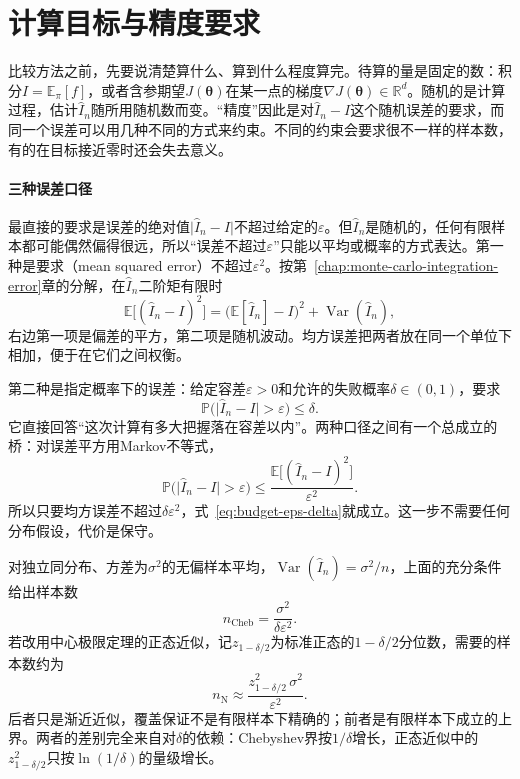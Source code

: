 \section{计算目标与精度要求}
\label{sec:budget-targets}

比较方法之前，先要说清楚算什么、算到什么程度算完。待算的量是固定的数：积分$I=\mathbb{E}_{\pi}[f]$，或者含参期望$J(\bm{\theta})$在某一点的梯度$\nabla J(\bm{\theta})\in\mathbb{R}^{d}$。随机的是计算过程，估计$\hat{I}_n$随所用随机数而变。“精度”因此是对$\hat{I}_n-I$这个随机误差的要求，而同一个误差可以用几种不同的方式来约束。不同的约束会要求很不一样的样本数，有的在目标接近零时还会失去意义。

\paragraph{三种误差口径}
最直接的要求是误差的绝对值$\lvert\hat{I}_n-I\rvert$不超过给定的$\varepsilon$。但$\hat{I}_n$是随机的，任何有限样本都可能偶然偏得很远，所以“误差不超过$\varepsilon$”只能以平均或概率的方式表达。第一种是要求（mean squared error）不超过$\varepsilon^{2}$。按第~\ref{chap:monte-carlo-integration-error}章的分解，在$\hat{I}_n$二阶矩有限时
\begin{equation}
  \mathbb{E}\bigl[(\hat{I}_n-I)^{2}\bigr]=\bigl(\mathbb{E}[\hat{I}_n]-I\bigr)^{2}+\operatorname{Var}(\hat{I}_n),
  \label{eq:budget-mse}
\end{equation}
右边第一项是偏差的平方，第二项是随机波动。均方误差把两者放在同一个单位下相加，便于在它们之间权衡。

第二种是指定概率下的误差：给定容差$\varepsilon>0$和允许的失败概率$\delta\in(0,1)$，要求
\begin{equation}
  \mathbb{P}\bigl(\lvert\hat{I}_n-I\rvert>\varepsilon\bigr)\le\delta .
  \label{eq:budget-eps-delta}
\end{equation}
它直接回答“这次计算有多大把握落在容差以内”。两种口径之间有一个总成立的桥：对误差平方用Markov不等式，
\[
  \mathbb{P}\bigl(\lvert\hat{I}_n-I\rvert>\varepsilon\bigr)\le\frac{\mathbb{E}\bigl[(\hat{I}_n-I)^{2}\bigr]}{\varepsilon^{2}} .
\]
所以只要均方误差不超过$\delta\varepsilon^{2}$，式~\eqref{eq:budget-eps-delta}就成立。这一步不需要任何分布假设，代价是保守。

对独立同分布、方差为$\sigma^{2}$的无偏样本平均，$\operatorname{Var}(\hat{I}_n)=\sigma^{2}/n$，上面的充分条件给出样本数
\begin{equation}
  n_{\mathrm{Cheb}}=\frac{\sigma^{2}}{\delta\varepsilon^{2}} .
  \label{eq:budget-n-cheb}
\end{equation}
若改用中心极限定理的正态近似，记$z_{1-\delta/2}$为标准正态的$1-\delta/2$分位数，需要的样本数约为
\begin{equation}
  n_{\mathrm{N}}\approx\frac{z_{1-\delta/2}^{2}\,\sigma^{2}}{\varepsilon^{2}} .
  \label{eq:budget-n-normal}
\end{equation}
后者只是渐近近似，覆盖保证不是有限样本下精确的；前者是有限样本下成立的上界。两者的差别完全来自对$\delta$的依赖：Chebyshev界按$1/\delta$增长，正态近似中的$z_{1-\delta/2}^{2}$只按$\ln(1/\delta)$的量级增长。

